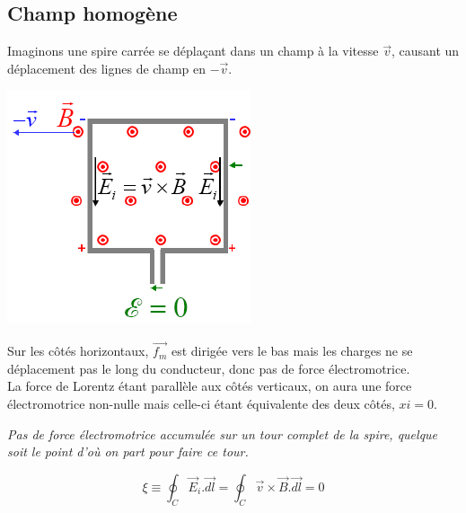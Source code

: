\documentclass	[11pt, a4paper, openany]{book}
\begin{document}
\subsection{Champ homogène}
Imaginons une spire carrée se déplaçant dans un champ à la vitesse $\vec{v}$, causant un déplacement des lignes de champ en $-\vec{v}$. 
\begin{center}
	\includegraphics[scale=0.45]{em/image8.png}\\
\end{center}
Sur les côtés horizontaux, $\vec{f_m}$ est dirigée vers le bas mais les charges ne se déplacement pas le long du conducteur, donc pas de force électromotrice.\\

La force de Lorentz étant parallèle aux côtés verticaux, on aura une force électromotrice non-nulle mais celle-ci étant équivalente des deux côtés, $xi = 0$.
\begin{center}
	\textit{Pas de force électromotrice accumulée sur un tour complet de la spire, quelque soit le point d'où on part pour faire ce tour.}
\end{center}
\begin{equation}
	\xi \equiv \oint_C \vec{E}_i.\vec{dl} = \oint_C \vec{v} \times \vec{B}.\vec{dl} = 0
\end{equation}
\end{document}
